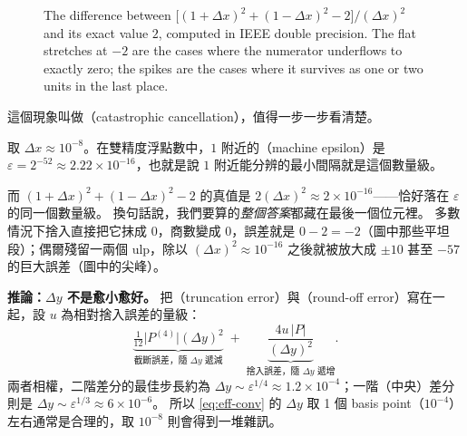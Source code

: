 \begin{figure}[H]
	\caption{The difference between
		$\bigl[(1+\Delta x)^{2}+(1-\Delta x)^{2}-2\bigr]/(\Delta x)^{2}$ and its exact
		value $2$, computed in IEEE double precision. The flat stretches at $-2$ are
		the cases where the numerator underflows to exactly zero; the spikes are the
		cases where it survives as one or two units in the last place.}
	\label{fig:fp-error}
\end{figure}

\suppstart
\begin{remark}
	這個現象叫做（catastrophic cancellation），值得一步一步看清楚。

	取 $\Delta x \approx 10^{-8}$。在雙精度浮點數中，$1$ 附近的（machine epsilon）是 $\varepsilon = 2^{-52}\approx 2.22\times 10^{-16}$，也就是說 $1$ 附近能分辨的最小間隔就是這個數量級。

	而 $(1+\Delta x)^{2}+(1-\Delta x)^{2}-2$ 的真值是 $2(\Delta x)^{2}\approx 2\times 10^{-16}$——恰好落在 $\varepsilon$ 的同一個數量級。
	換句話說，我們要算的\emph{整個答案}都藏在最後一個位元裡。
	多數情況下捨入直接把它抹成 $0$，商數變成 $0$，誤差就是 $0-2=-2$（圖中那些平坦段）；偶爾殘留一兩個 ulp，除以 $(\Delta x)^{2}\approx 10^{-16}$ 之後就被放大成 $\pm 10$ 甚至 $-57$ 的巨大誤差（圖中的尖峰）。

	\textbf{推論：$\Delta y$ 不是愈小愈好。}
	把（truncation error）與（round-off error）寫在一起，設 $u$ 為相對捨入誤差的量級：
	\[
		\underbrace{\tfrac{1}{12}\bigl|P^{(4)}\bigr|(\Delta y)^{2}}_{\text{截斷誤差，隨 }\Delta y\text{ 遞減}}
		\;+\;
		\underbrace{\frac{4u\,|P|}{(\Delta y)^{2}}}_{\text{捨入誤差，隨 }\Delta y\text{ 遞增}} .
	\]
	兩者相權，二階差分的最佳步長約為 $\Delta y \sim \varepsilon^{1/4}\approx 1.2\times 10^{-4}$；一階（中央）差分則是 $\Delta y\sim\varepsilon^{1/3}\approx 6\times 10^{-6}$。
	所以 \eqref{eq:eff-conv} 的 $\Delta y$ 取 1 個 basis point（$10^{-4}$）左右通常是合理的，取 $10^{-8}$ 則會得到一堆雜訊。
\end{remark}
\suppend


